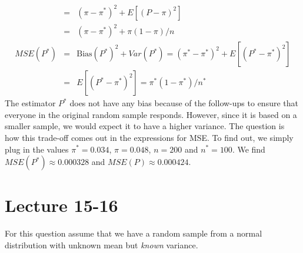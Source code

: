 \documentclass[addpoints,12pt]{exam}\usepackage[]{graphicx}\usepackage[]{color}
\begin{document}
\begin{questions}
\begin{solution}
\begin{eqnarray*}
		&=& (\pi - \pi^*)^2 + E[(P - \pi)^2]\\
		&=&  (\pi - \pi^*)^2 + \pi(1-\pi)/n\\
		MSE(P^*)	&=& \mbox{Bias}(P^*)^2 + Var(P^*) = (\pi^* - \pi^*)^2 + E[(P^* - \pi^*)^2]\\
			&=& E[(P^* - \pi^*)^2] = \pi^*(1-\pi^*)/n^*
	\end{eqnarray*}
The estimator $P^*$ does not have any bias because of the follow-ups to ensure that everyone in the original random sample responds. However, since it is based on a smaller sample, we would expect it to have a higher variance. The question is how this trade-off comes out in the expressions for MSE. To find out, we simply plug in the values $\pi^* = 0.034$, $\pi = 0.048$, $n =200$ and $n^* = 100$. We find $MSE(P^*) \approx 0.000328$ and $MSE(P) \approx 0.000424$.
    \end{solution}
    
\section*{Lecture 15-16}

    \question For this question assume that we have a random sample from a normal distribution with unknown mean but \emph{known} variance.
\end{questions}
\end{document}
